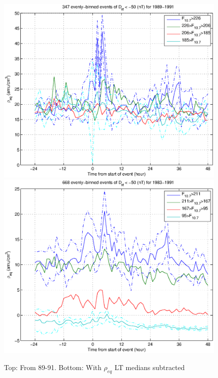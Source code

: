\documentclass[10pt,twocolumn]{article}
\begin{document}
\begin{figure}[htp!]
\includegraphics[scale=0.45]{paperfigures/HighLowF107rhoeq-Dst50-tak.eps}
\includegraphics[scale=0.45]{paperfigures/HighLowF107rhoeq-Dst50-detrend.eps}
\caption{Top: From 89-91. Bottom: With $\rho_{eq}$ LT medians subtracted}
\end{figure}
\end{document}

